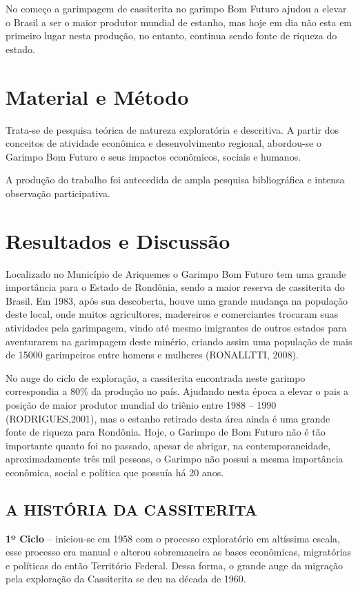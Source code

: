 \documentclass[article,12pt,onesidea,4paper,english,brazil]{abntex2}
\begin{document}
No começo a garimpagem de cassiterita no garimpo Bom Futuro ajudou a elevar o Brasil a ser o maior produtor mundial de estanho, mas hoje em dia não esta em primeiro lugar nesta produção, no entanto, continua sendo fonte de riqueza do estado.
	
	\section*{Material e Método}
	
Trata-se de pesquisa teórica de natureza exploratória e descritiva. A partir dos conceitos de atividade econômica e desenvolvimento regional, abordou-se o Garimpo Bom Futuro e seus impactos econômicos, sociais e humanos.

A produção do trabalho foi antecedida de ampla pesquisa bibliográfica e intensa observação participativa.
	
	\section*{Resultados e Discussão}
	
Localizado no Município de Ariquemes o Garimpo Bom Futuro tem uma grande importância para o Estado de Rondônia, sendo a maior reserva de cassiterita do Brasil. Em 1983, após sua descoberta, houve uma grande mudança na população deste local, onde muitos agricultores, madereiros e comerciantes trocaram suas atividades pela garimpagem, vindo até mesmo imigrantes de outros estados para aventurarem na garimpagem deste minério, criando assim uma população de mais de 15000 garimpeiros entre homens e mulheres (RONALLTTI, 2008).

No auge do ciclo de exploração, a cassiterita encontrada neste garimpo correspondia a 80\% da produção no país. Ajudando nesta época a elevar o pais a posição de maior produtor mundial do triênio entre 1988 – 1990 (RODRIGUES,2001), mas o estanho retirado desta área ainda é uma grande fonte de riqueza para Rondônia. Hoje, o Garimpo de Bom Futuro não é tão importante quanto foi no passado, apesar de abrigar, na contemporaneidade, aproximadamente três mil pessoas, o Garimpo não possui a mesma importância econômica, social e política que possuía há 20 anos.

\subsection{A HISTÓRIA DA CASSITERITA}

\textbf{1º Ciclo} – iniciou-se em 1958 com o processo exploratório em altíssima escala, esse processo era manual e alterou sobremaneira as bases econômicas, migratórias e políticas do então Território Federal. Dessa forma, o grande auge da migração pela exploração da Cassiterita se deu na década de 1960.
\end{document}
